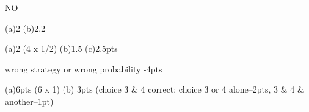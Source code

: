\documentclass[quiz]{mcs}
\begin{document}
\examspace
NO    
\fi

\examspace
\begin{staffnotes}
(a)2 (b)2,2
\end{staffnotes}

\iffalse
\examspace  %
\pinput[points = 10, title =

NO   \textbf{string inclusion exclusion}]{FP_string_inclusion_exclusion}

\examspace  %
  \pinput[points = 8, title =
GOOD    \textbf{paths inclusion exclusion}]{FP_paths_inclusion_exclusion}

\examspace  %
GOOD \pinput[points = 10, title =
  \textbf{combinatorial binomial}]{FP_combinatorial_binomial}
\fi

\examspace

\begin{staffnotes}
(a)2 (4 x 1/2) (b)1.5 (c)2.5pts
\end{staffnotes}

\examspace
\begin{staffnotes}
wrong strategy or wrong probability -4pts
\end{staffnotes}

\iffalse

\exampsace %
\pinput[points = 6, title =
  \textbf{towers of Sheboygan}]{FP_towers_of_Sheboygan}

\examspace  %
\pinput[points=6, title =
  \textbf{college probability}]{FP_college_probability}
\fi

\examspace %


\examspace   %

\examspace  %
\begin{staffnotes}
(a)6pts (6 x 1) (b) 3pts (choice 3 \& 4 correct;
choice 3 or 4 alone--2pts, 3 \& 4 \& another--1pt)
\end{staffnotes}

\iffalse
\examspace
\pinput[points = 6, title =
GOOD  \textbf{chebyshev hat check}]{FP_chebyshev_hat_check}

\examspace
\pinput[points = 6, title =
NO  \textbf{coloring complete triangles}]{FP_coloring_complete_triangles}
\fi
\end{document}
